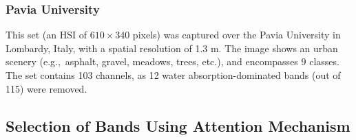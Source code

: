 \documentclass[journal]{IEEEtran}
\begin{document}
\subsubsection{Pavia University}

This set (an HSI of $610\times 340$ pixels) was captured over the Pavia University in Lombardy, Italy, with a spatial resolution of 1.3 m. The image shows an urban scenery (e.g.,~asphalt, gravel, meadows, trees, etc.), and encompasses 9 classes. The set contains 103 channels, as 12 water absorption-dominated bands (out of 115) were removed.


\subsection{Selection of Bands Using Attention Mechanism}
\end{document}
